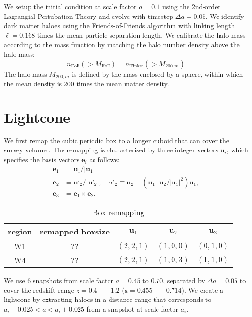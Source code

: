 \documentclass[a4paper,11pt]{article}
\begin{document}
We setup the initial condition at scale factor $a=0.1$ using the 2nd-order
Lagrangial Pertubation Theory and evolve with timestep $\Delta a =
0.05$. We identify dark matter haloes using the Friends-of-Friends algorithm
\citep{1985ApJ...292..371D} with linking length $\ell = 0.168$ times
the mean particle separation length. We calibrate the halo mass according to the \citet{2010ApJ...724..878T} mass function by matching the halo number density above the halo mass:
\begin{equation}
  n_\mathrm{FoF}(>M_\mathrm{FoF}) = n_\mathrm{Tinker}(>M_{200,m})
\end{equation}
The halo mass $M_{200,m}$ is defined by the mass enclosed by a sphere, within
which the mean density is 200 times the mean matter density.

\section{Lightcone}
We first remap the cubic periodic box to a longer cuboid that can cover
the survey volume \citep{2010ApJS..190..311C}. The remapping is
characterised by three integer vectors $\bm{u}_i$, which specifies
the basis vectors $\bm{e}_i$ as follows:
%
\begin{align}
  \label{eq:remapping}
  \bm{e}_1 &= \bm{u}_1/|\bm{u}_1| \nonumber\\
  \bm{e}_2 &= \bm{u}'_2/|\bm{u}'_2|,
    \quad u'_2  \equiv \bm{u}_2 -
    (\bm{u}_1 \cdot \bm{u}_2/|\bm{u}_1|^2) \bm{u}_1,   \nonumber \\
  \bm{e}_3 &= \bm{e}_1 \times \bm{e}_2.
\end{align}
%

\begin{table}
\begin{center}
\begin{tabular}{ccccc}
\hline
region & remapped boxsize & $\bm{u}_1$ & $\bm{u}_2$ & $\bm{u}_3$\\  
\hline
W1 & ?? & $(2, 2, 1)$ & $(1, 0, 0)$ & $(0, 1, 0)$\\
W4 & ?? & $(2, 2, 1)$ & $(1, 0, 3)$ & $(1, 1, 0)$\\
\hline
\end{tabular}
\end{center}
\caption{Box remapping}
\label{table:box-remapping}
\end{table}

We use 6 snapshots from scale factor $a=0.45$ to $0.70$, separated by
$\Delta a = 0.05$ to cover the redshift range $z= 0.4 -- 1.2$ ($a =
0.455 -- 0.714$). We create a lightcone by extracting haloes in a
distance range that corresponds to $a_i - 0.025 < a < a_i + 0.025$ from a
snapshot at scale factor $a_i$.
\end{document}
